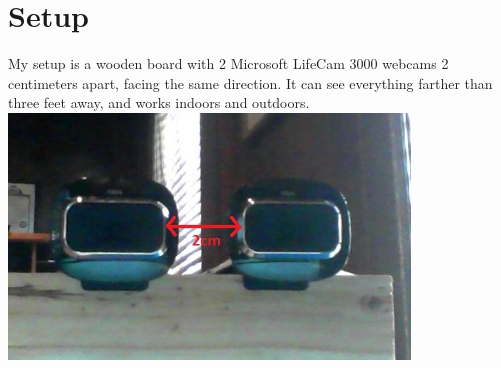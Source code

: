 \documentclass[11pt,fleqn]{article}
\begin{document}
\section{Setup}
My setup is a wooden board with 2 Microsoft LifeCam 3000 webcams 2 centimeters apart, facing the same direction. It can see everything farther than three feet away, and works indoors and outdoors.\\[2pt]

\includegraphics[width=0.8\textwidth]{images/setup.jpg}
\end{document}
